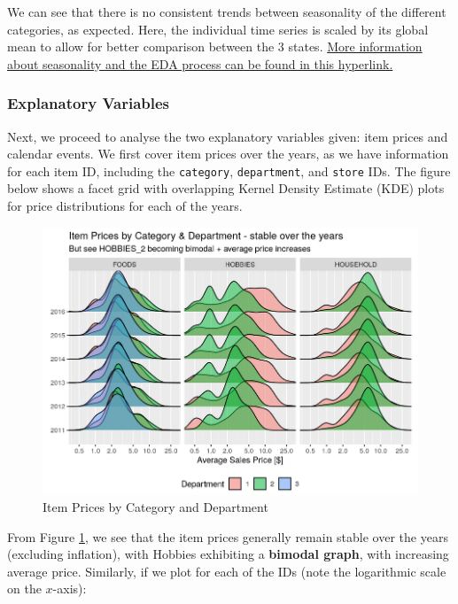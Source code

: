 \documentclass[12pt]{article}
\begin{document}
\noindent We can see that there is no consistent trends between seasonality of the different categories, as expected. Here, the individual time series is scaled by its global mean to allow for better comparison between the 3 states. \href{https://www.kaggle.com/code/headsortails/back-to-predict-the-future-interactive-m5-eda/report}{More information about seasonality and the EDA process can be found in this hyperlink.}

\subsubsection*{Explanatory Variables}

Next, we proceed to analyse the two explanatory variables given: item prices and calendar events. We first cover item prices over the years, as we have information for each item ID, including the \verb|category|, \verb|department|, and \verb|store| IDs. The figure below shows a facet grid with overlapping Kernel Density Estimate (KDE) plots for price distributions for each of the years.

\begin{figure}[H]
    \centering
    \includegraphics[width=\textwidth]{Images/itempricesfacet.png}
    \caption{Item Prices by Category and Department}
    \label{fig:6-itemprices}
\end{figure} 

\noindent From Figure \ref{fig:6-itemprices}, we see that the item prices generally remain stable over the years (excluding inflation), with Hobbies exhibiting a \textbf{bimodal graph}, with increasing average price. Similarly, if we plot for each of the IDs (note the logarithmic scale on the $x$-axis):
\end{document}
